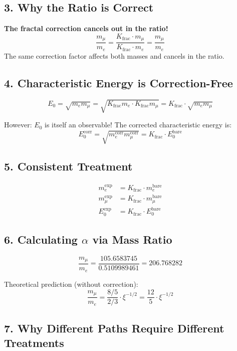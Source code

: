 \documentclass[12pt,a4paper]{article}
\theoremstyle{definition}
\begin{document}
\subsection*{3. Why the Ratio is Correct}

\begin{tcolorbox}[colback=green!5!white,colframe=green!75!black]
	\textbf{The fractal correction cancels out in the ratio!}
	\[
	\frac{m_\mu}{m_e} = \frac{K_{\text{frac}} \cdot m_\mu}{K_{\text{frac}} \cdot m_e} = \frac{m_\mu}{m_e}
	\]
	The same correction factor affects both masses and cancels in the ratio.
\end{tcolorbox}

\subsection*{4. Characteristic Energy is Correction-Free}

\[
E_0 = \sqrt{m_e m_\mu} = \sqrt{K_{\text{frac}} m_e \cdot K_{\text{frac}} m_\mu} = K_{\text{frac}} \cdot \sqrt{m_e m_\mu}
\]

However: $E_0$ is itself an observable! The corrected characteristic energy is:
\[
E_0^{\text{corr}} = \sqrt{m_e^{\text{corr}} m_\mu^{\text{corr}}} = K_{\text{frac}} \cdot E_0^{\text{bare}}
\]

\subsection*{5. Consistent Treatment}

\begin{align*}
	m_e^{\text{exp}} &= K_{\text{frac}} \cdot m_e^{\text{bare}} \\
	m_\mu^{\text{exp}} &= K_{\text{frac}} \cdot m_\mu^{\text{bare}} \\
	E_0^{\text{exp}} &= K_{\text{frac}} \cdot E_0^{\text{bare}}
\end{align*}

\subsection*{6. Calculating $\alpha$ via Mass Ratio}

\[
\frac{m_\mu}{m_e} = \frac{105.6583745}{0.5109989461} = 206.768282
\]

Theoretical prediction (without correction):
\[
\frac{m_\mu}{m_e} = \frac{8/5}{2/3} \cdot \xi^{-1/2} = \frac{12}{5} \cdot \xi^{-1/2}
\]

\subsection*{7. Why Different Paths Require Different Treatments}
\end{document}
